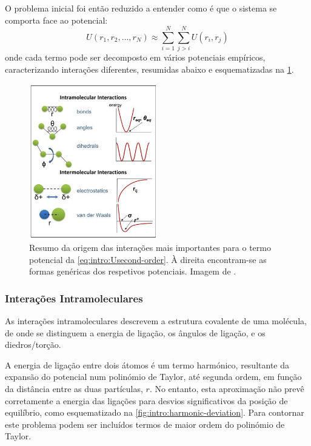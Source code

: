 \documentclass[12pt,a4paper]{article}
\begin{document}
	O problema inicial foi então reduzido a entender como é que o sistema se comporta face ao potencial:
	\begin{equation}
		U\left(r_{1}, r_{2}, \ldots, r_{N}\right) \approx \sum_{i=1}^{N} \sum_{j>i}^{N} U\left(r_{i}, r_{j}\right)
		\label{eq:intro:Usecond-order}
	\end{equation}
	onde cada termo pode ser decomposto em vários potenciais empíricos, caracterizando interações diferentes, resumidas abaixo e esquematizadas na \cref{fig:intro:inters}.

	\begin{figure}[h]
		\centering
		\includegraphics[width=0.5\textwidth]{images/interactions.jpeg}
		\caption{Resumo da origem das interações mais importantes para o termo potencial da \cref{eq:intro:Usecond-order}. À direita encontram-se as formas genéricas dos respetivos potenciais. Imagem de \cite{cheathamMolecularModelingNucleic2001}.}
		\label{fig:intro:inters}
	\end{figure}

\subsubsection{Interações Intramoleculares}
	As interações intramoleculares descrevem a estrutura covalente de uma molécula, de onde se distinguem a energia de ligação, os ângulos de ligação, e os diedros/torção.
	
	A energia de ligação entre dois átomos é um termo harmónico, resultante da expansão do potencial num polinómio de Taylor, até segunda ordem, em função da distância entre as duas partículas, $r$. No entanto, esta aproximação não prevê corretamente a energia das ligações  para desvios significativos da posição de equilíbrio, como esquematizado na \cref{fig:intro:harmonic-deviation}. Para contornar este problema podem ser incluídos termos de maior ordem do polinómio de Taylor.
	
\end{document}
